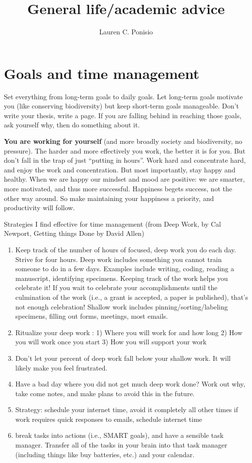 \documentclass[12pt]{article}
\begin{document}
\title{General life/academic advice}
\author{Lauren C. Ponisio}

\maketitle

\section{Goals and time management}
\label{sec:goals}
Set everything from long-term goals to daily goals. Let long-term
goals motivate you (like conserving biodiversity) but keep short-term
goals manageable. Don't write your thesis, write a page.  If you are
falling behind in reaching those goals, ask yourself why, then do
something about it.

\textbf{You are working for yourself} (and more broadly society and
biodiversity, no pressure). The harder and more effectively you work,
the better it is for you. But don't fall in the trap of just ``putting
in hours''.  Work hard and concentrate hard, and enjoy the work and
concentration. But most importantly, stay happy and healthy. When we
are happy our mindset and mood are positive: we are smarter, more
motivated, and thus more successful. Happiness begets success, not the
other way around. So make maintaining your happiness a priority, and
productivity will follow. 

Strategies I find effective for time management (from Deep Work, by
Cal Newport, Getting things Done by David Allen)
\begin{enumerate}
\item Keep track of the number of hours of focused, deep work you do
  each day. Strive for four hours. Deep work includes something you
  cannot train someone to do in a few days. Examples include writing,
  coding, reading a manuscript, identifying specimens. Keeping track
  of the work helps you celebrate it! If you wait to celebrate your
  accomplishments until the culmination of the work (i.e., a grant is
  accepted, a paper is published), that's not enough celebration!
  Shallow work includes pinning/sorting/labeling specimens, filling
  out forms, meetings, most emails.
\item Ritualize your deep work : 1) Where you will work for and how
  long 2) How you will work once you start 3) How you will support
  your work
\item Don't let your percent of deep work fall below your shallow
  work. It will likely make you feel frustrated. 
\item Have a bad day where you did not get much deep work done? Work
  out why, take come notes, and make plans to avoid this in the
  future.
\item Strategy: schedule your internet time, avoid it completely all
  other times if work requires quick responses to emails, schedule
  internet time
\item break tasks into actions (i.e., SMART goals), and have a
  sensible task manager. Transfer all of the tasks in your brain into
  that task manager (including things like buy batteries, etc.) and
  your calendar.
\end{enumerate}
\end{document}
